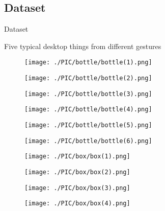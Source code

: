 \documentclass[xcolor=table,compress,blue]{beamer}
\begin{document}
\subsection{Dataset}
\begin{frame}{Dataset}
	\begin{exampleblock}{Five typical desktop things from different gestures}
		\begin{figure}[htpb]
			\centering
			\begin{minipage}[b]{0.65in}
				\centerline{ \texttt{[image: ./PIC/bottle/bottle(1).png]} }
			\end{minipage}
			\begin{minipage}[b]{0.65in}
				\centerline{ \texttt{[image: ./PIC/bottle/bottle(2).png]} }
			\end{minipage}
			\begin{minipage}[b]{0.65in}
				\centerline{ \texttt{[image: ./PIC/bottle/bottle(3).png]} }
			\end{minipage}
			\begin{minipage}[b]{0.65in}
				\centerline{ \texttt{[image: ./PIC/bottle/bottle(4).png]} }
			\end{minipage}
			\begin{minipage}[b]{0.65in}
				\centerline{ \texttt{[image: ./PIC/bottle/bottle(5).png]} }
			\end{minipage}
			\begin{minipage}[b]{0.65in}
				\centerline{ \texttt{[image: ./PIC/bottle/bottle(6).png]} }
			\end{minipage}
			\begin{minipage}[b]{0.65in}
				\centerline{ \texttt{[image: ./PIC/box/box(1).png]} }
			\end{minipage}
			\begin{minipage}[b]{0.65in}
				\centerline{ \texttt{[image: ./PIC/box/box(2).png]} }
			\end{minipage}
			\begin{minipage}[b]{0.65in}
				\centerline{ \texttt{[image: ./PIC/box/box(3).png]} }
			\end{minipage}
			\begin{minipage}[b]{0.65in}
				\centerline{ \texttt{[image: ./PIC/box/box(4).png]} }
			\end{minipage}

\end{figure}
\end{exampleblock}
\end{frame}
\end{document}
